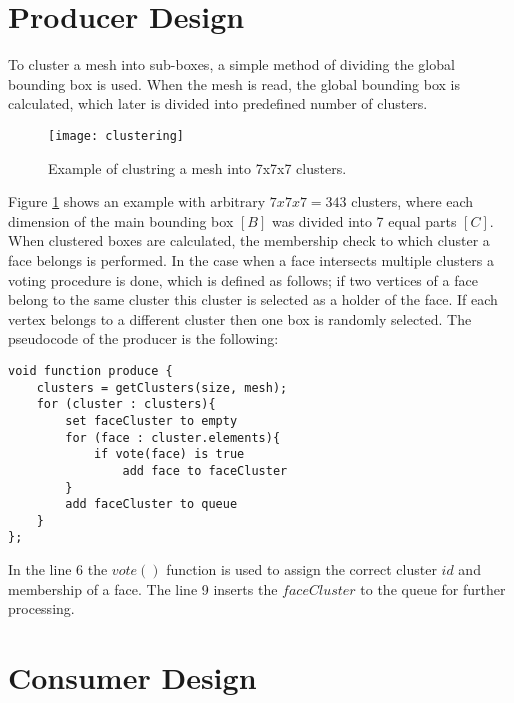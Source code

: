 \newpage
\section{Producer Design}

To cluster a mesh into sub-boxes, a simple method of dividing the global bounding box is used. When the mesh is read, the global bounding box is calculated, which later is divided into predefined number of clusters.

\begin{figure}[H]
  \begin{center}
    \texttt{[image: clustering]}
    \caption{Example of clustring a mesh into 7x7x7 clusters.}
    \label{fig:clustering}
  \end{center}
\end{figure}

Figure \ref{fig:clustering} shows an example with arbitrary $7x7x7=343$ clusters, where each dimension of the main bounding box $[B]$ was divided into 7 equal parts $[C]$. When clustered boxes are calculated, the membership check to which cluster a face belongs is performed. In the case when a face intersects multiple clusters a voting procedure is done, which is defined as follows; if two vertices of a face belong to the same cluster this cluster is selected as a holder of the face. If each vertex belongs to a different cluster then one box is randomly selected. The pseudocode of the producer is the following:
\newline
\begin{center}
\begin{lstlisting}[caption={C style psuedocode of a producer.},captionpos=b]
void function produce {
    clusters = getClusters(size, mesh);
    for (cluster : clusters){
        set faceCluster to empty
        for (face : cluster.elements){
            if vote(face) is true
                add face to faceCluster
        }
        add faceCluster to queue
    }
};
\end{lstlisting}
\end{center}

In the line 6 the $vote()$ function is used to assign the correct cluster $id$ and membership of a face. The line 9 inserts the $faceCluster$ to the queue for further processing.

\newpage
\section{Consumer Design}

